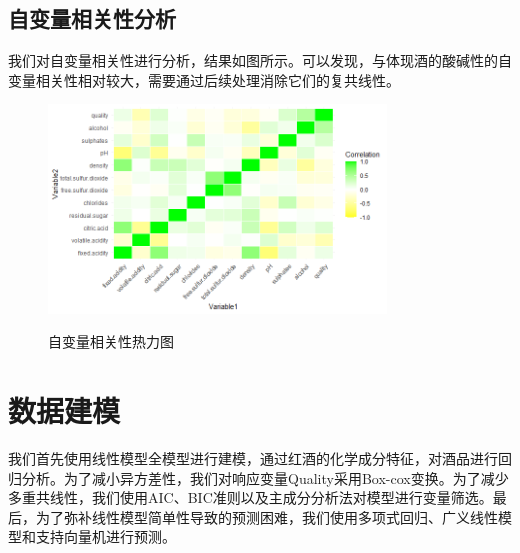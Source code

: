 \documentclass[fontset=ubuntu]{ctexart}
\begin{document}
        \subsection{自变量相关性分析}
            我们对自变量相关性进行分析，结果如图所示。可以发现，与体现酒的酸碱性的自变量相关性相对较大，需要通过后续处理消除它们的复共线性。
            \begin{figure}[htbp]
                \centering
                \includegraphics[width=0.8\textwidth]{../figures/covariance.png}
                \label{fig:covariance}
                \caption{自变量相关性热力图}
            \end{figure}
    \section{数据建模}
        我们首先使用线性模型全模型进行建模，通过红酒的化学成分特征，对酒品进行回归分析。为了减小异方差性，我们对响应变量Quality采用Box-cox变换。为了减少多重共线性，我们使用AIC、BIC准则以及主成分分析法对模型进行变量筛选。最后，为了弥补线性模型简单性导致的预测困难，我们使用多项式回归、广义线性模型和支持向量机进行预测。
        \clearpage
\end{document}
